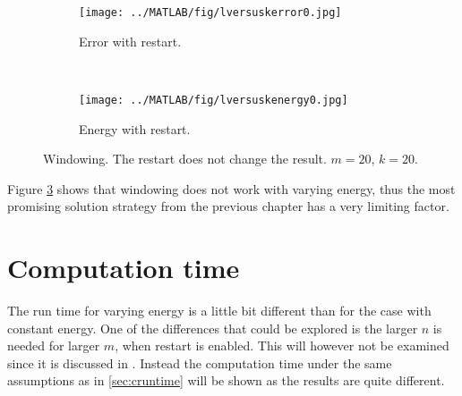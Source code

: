 \begin{figure}[H]
        \centering
        \begin{subfigure}[b]{0.45\textwidth}
                \texttt{[image: ../MATLAB/fig/lversuskerror0.jpg]}
                \caption{ Error with restart. }
                \label{fig:lversuskerror0}
        \end{subfigure}
		~
		\begin{subfigure}[b]{0.45\textwidth}
                \texttt{[image: ../MATLAB/fig/lversuskenergy0.jpg]}
                \caption{ Energy with restart. }
                \label{fig:lversuskenergy0}
        \end{subfigure}
                \caption{ Windowing. The restart does not change the result. $m = 20$, $k= 20$.}
        \label{fig:lversuskenergy}
\end{figure}
Figure \ref{fig:lversuskenergy} shows that windowing does not work with varying energy, thus the most promising solution strategy from the previous chapter has a very limiting factor.\\


\section{Computation time} %
The run time for varying energy is a little bit different than for the case with constant energy. One of the differences that could be explored is the larger $n$ is needed for larger $m$, when restart is enabled. This will however not be examined since it is discussed in \cite{min}. Instead the computation time under the same assumptions as in \ref{sec:cruntime} will be shown as the results are quite different.
